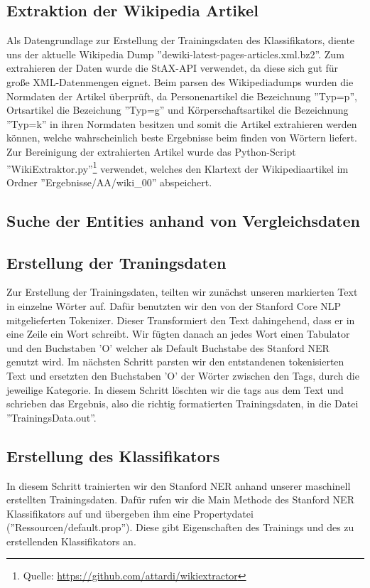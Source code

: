 \documentclass[a4paper]{article}
\begin{document}
	\subsection{Extraktion der Wikipedia Artikel}
		Als Datengrundlage zur Erstellung der Trainingsdaten des Klassifikators, diente uns der aktuelle Wikipedia Dump ''dewiki-latest-pages-articles.xml.bz2''. 
		Zum extrahieren der Daten wurde die StAX-API verwendet, da diese sich gut für große XML-Datenmengen eignet. 
		Beim parsen des Wikipediadumps wurden die Normdaten der Artikel überprüft, da Personenartikel die Bezeichnung ''Typ=p'', Ortsartikel die Bezeichung ''Typ=g'' und Körperschaftsartikel die Bezeichnung ''Typ=k'' in ihren Normdaten besitzen und somit die Artikel extrahieren werden können, welche wahrscheinlich beste Ergebnisse beim finden von Wörtern liefert. 
		Zur Bereinigung der extrahierten Artikel wurde das Python-Script ''WikiExtraktor.py''\footnote{Quelle: \url{https://github.com/attardi/wikiextractor}} verwendet, welches den Klartext der Wikipediaartikel im Ordner ''Ergebnisse/AA/wiki\_00'' abspeichert.
	\subsection{Suche der Entities anhand von Vergleichsdaten}
	
	\subsection{Erstellung der Traningsdaten}
		Zur Erstellung der Trainingsdaten, teilten wir zunächst unseren markierten Text in einzelne Wörter auf. 
		Dafür benutzten wir den von der Stanford Core NLP mitgelieferten Tokenizer. 
		Dieser Transformiert den Text dahingehend, dass er in eine Zeile ein Wort schreibt. 
		Wir fügten danach an jedes Wort einen Tabulator und den Buchstaben 'O' welcher als Default Buchstabe des Stanford NER genutzt wird.
		Im nächsten Schritt parsten wir den entstandenen tokenisierten Text und ersetzten den Buchstaben 'O' der Wörter zwischen den Tags, durch die jeweilige Kategorie. 
		In diesem Schritt löschten wir die tags aus dem Text und schrieben das Ergebnis, also die richtig formatierten Trainingsdaten, in die Datei ''TrainingsData.out''.
	\subsection{Erstellung des Klassifikators}
		In diesem Schritt trainierten wir den Stanford NER anhand unserer maschinell erstellten Trainingsdaten. 
		Dafür rufen wir die Main Methode des Stanford NER Klassifikators auf und übergeben ihm eine Propertydatei (''Ressourcen/default.prop''). 
		Diese gibt Eigenschaften des Trainings und des zu erstellenden Klassifikators an.
\end{document}
